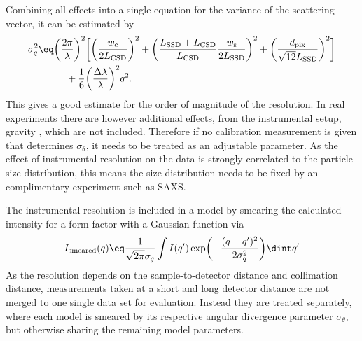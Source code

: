 \documentclass[\main/dresen_thesis.tex]{subfiles}
\begin{document}
    Combining all effects into a single equation for the variance of the scattering vector, it can be estimated by
    \begin{align}
      \begin{split}\label{eq:methods:sans:instrumentalResolution}
        \sigma_q^2
        &\eq
          \biggl( \frac{2\pi}{\lambda} \biggr)^2 \biggl[ \biggl( \frac{w_\mathrm{c}}{2 L_\mathrm{CSD}} \biggr)^2 +
          \biggl( \frac{L_\mathrm{SSD} + L_\mathrm{CSD}}{L_\mathrm{CSD}} \frac{w_\mathrm{s}}{2 L_\mathrm{SSD}} \biggr)^2 +
          \biggl( \frac{d_\mathrm{pix}}{\sqrt{12} L_\mathrm{SSD}} \biggr)^2 \biggr] \\
        &\hspace{1cm}+ \frac{1}{6} \biggl( \frac{\Delta \lambda}{\lambda} \biggr)^2 q^2 .
      \end{split}
    \end{align}
    This gives a good estimate for the order of magnitude of the resolution.
    In real experiments there are however additional effects, from the instrumental setup, gravity \etc, which are not included.
    Therefore if no calibration measurement is given that determines $\sigma_\theta$, it needs to be treated as an adjustable parameter.
    As the effect of instrumental resolution on the data is strongly correlated to the particle size distribution, this means the size distribution needs to be fixed by an complimentary experiment such as SAXS.

    The instrumental resolution is included in a model by smearing the calculated intensity for a form factor with a Gaussian function via
    \begin{align}
      I_\mathrm{smeared} (q) \eq \frac{1}{\sqrt{2 \pi}\sigma_q}  \int I(q^\prime) \exp\biggl(-\frac{(q - q^\prime)^2}{2 \sigma_q^2}\biggr)\dint q^\prime
    \end{align}
    As the resolution depends on the sample-to-detector distance and collimation distance, measurements taken at a short and long detector distance are not merged to one single data set for evaluation.
    Instead they are treated separately, where each model is smeared by its respective angular divergence parameter $\sigma_\theta$, but otherwise sharing the remaining model parameters.
\end{document}
